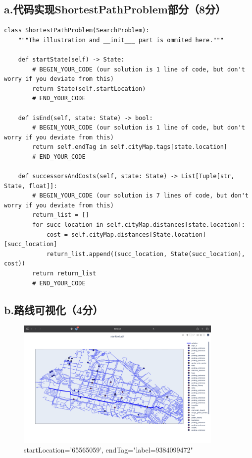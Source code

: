 \documentclass{article}
\begin{document}
\subsection*{a.代码实现ShortestPathProblem部分（8分）}
\begin{lstlisting}
class ShortestPathProblem(SearchProblem):
    """The illustration and __init___ part is ommited here."""

    def startState(self) -> State:
        # BEGIN_YOUR_CODE (our solution is 1 line of code, but don't worry if you deviate from this)
        return State(self.startLocation)
        # END_YOUR_CODE

    def isEnd(self, state: State) -> bool:
        # BEGIN_YOUR_CODE (our solution is 1 line of code, but don't worry if you deviate from this)
        return self.endTag in self.cityMap.tags[state.location]
        # END_YOUR_CODE

    def successorsAndCosts(self, state: State) -> List[Tuple[str, State, float]]:
        # BEGIN_YOUR_CODE (our solution is 7 lines of code, but don't worry if you deviate from this)
        return_list = []
        for succ_location in self.cityMap.distances[state.location]:
            cost = self.cityMap.distances[State.location][succ_location]
            return_list.append((succ_location, State(succ_location), cost))
        return return_list
        # END_YOUR_CODE
\end{lstlisting}

\subsection*{b.路线可视化（4分）}
\begin{figure}[H]
    \centering
    \includegraphics[width=10cm]{pics/long.png}
    \caption{startLocation='65565059', endTag="label=9384099472"}
\end{figure}
\end{document}
